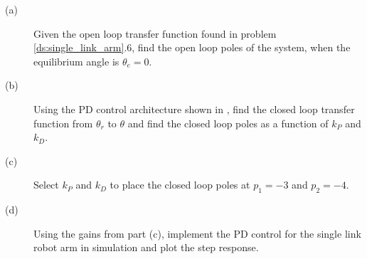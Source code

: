 
\begin{description}
\item[(a)]
Given the open loop transfer function found in problem \ref{ds:single_link_arm}.6, find the open loop poles of the system, when the equilibrium angle is $\theta_e=0$.
\item[(b)]
Using the PD control architecture shown in , find the closed loop transfer function from $\theta_r$ to $\theta$ and find the closed loop poles as a function of $k_P$ and $k_D$.
\item[(c)]  Select $k_P$ and $k_D$ to place the closed loop poles at $p_1=-3$ and $p_2=-4$.
\item[(d)] Using the gains from part (c), implement the PD control for the single link robot arm in simulation and plot the step response.

\end{description}